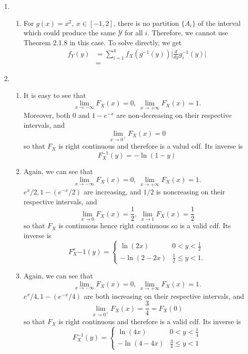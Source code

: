 \documentclass{article}
\begin{document}
\begin{enumerate}
    \item \begin{enumerate}
        \item For $g(x)=x^2, \ x \in [-1, 2]$, there is no partition $\{A_i\}$ of the interval which could 
        produce the same $\mathcal{Y}$ for all $i$. Therefore, we cannot use Theorem 2.1.8 in this case. 
        To solve directly, we get 
        \begin{align*}
            f_{Y}(y) 
            &= \sum_{i = 1}^{4} f_{X}(g^{-1}(y)) \Big| \frac{d}{dy}g_{i}^{-1}(y) \Big| \\
            &= 
        \end{align*}
    \end{enumerate}

    \item \begin{enumerate}
        \item It is easy to see that 
        \[ \lim_{x \to -\infty} F_{X}(x) = 0, \ \lim_{x \to +\infty} F_{X}(x) = 1. \]
        Moreover, both $0$ and $1-e^{-x}$ are non-decreasing on their respective intervals, and 
        \[ \lim_{x \to 0^+} F_{X}(x) = 0 \]
        so that $F_X$ is right continuous and therefore is a valud cdf. Its inverse is 
        \[ F_{X}^{-1}(y) = -\ln{(1 - y)}\]

        \item Again, we can see that 
        \[ \lim_{x \to -\infty} F_{X}(x) = 0, \ \lim_{x \to +\infty} F_{X}(x) = 1. \]
        $e^{x} / 2, 1 - (e^{-x} / 2)$ are increasing, and $1/2$ is noncreasing on their respective intervals, 
        and 
        \[ \lim_{x \to 0} F_{X}(x) = \frac{1}{2}, \ \lim_{x \to 1} F_{X}(x) = \frac{1}{2} \]
        so that $F_X$ is continuous hence right continuous so is a valid cdf. Its inverse is
        \[ F_{X}^s{-1}(y) = \begin{cases}
            \ln{(2x)} & 0 < y < \frac{1}{2} \\
            -\ln{(2-2x)} & \frac{1}{2} \leq y < 1.
        \end{cases} \]

        \item Again, we can see that 
        \[ \lim_{x \to -\infty} F_{X}(x) = 0, \ \lim_{x \to +\infty} F_{X}(x) = 1. \]
        $e^{x}/4, 1 - (e^{-x} / 4)$ are both increasing on their respective intervals, and 
        \[ \lim_{x \to 0^+} F_{X}(x) = \frac{3}{4} = F_{X}(0) \]
        so that $F_X$ is right continuous and therefore is a valid cdf. Its inverse is 
        \[ F_{X}^{-1}(y) = \begin{cases}
            \ln{(4x)} & 0 < y < \frac{1}{4} \\
            -\ln{(4-4x)} & \frac{3}{4} \leq y < 1
        \end{cases}\]
    \end{enumerate}


\end{enumerate}
\end{document}
